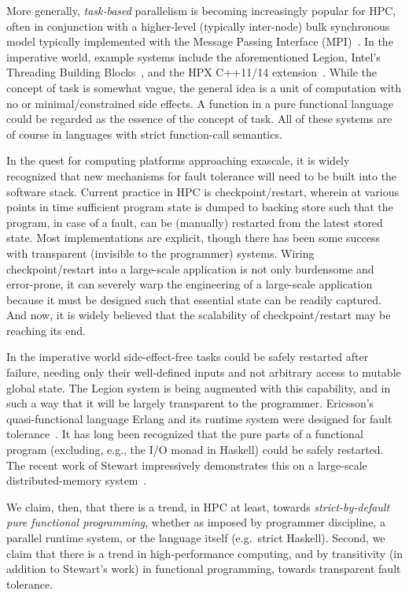 \documentclass{llncs}
\begin{document}
More generally, \emph{task-based} parallelism is becoming increasingly popular
for HPC, often in conjunction with a higher-level (typically inter-node) bulk
synchronous model typically implemented with the Message Passing Interface
(MPI)~\cite{MPI}.  In the imperative world, example systems include the
aforementioned Legion, Intel's Threading Building Blocks~\cite{Reinders:2007},
and the HPX C++11/14 extension~\cite{HPX}.  While the concept of task is
somewhat vague, the general idea is a unit of computation with no or
minimal/constrained side effects.  A function in a pure functional language
could be regarded as the essence of the concept of task.  All of these
systems are of course in languages with strict function-call semantics.

In the quest for computing platforms approaching exascale, it is widely
recognized that new mechanisms for fault tolerance will need to be built into
the software stack.  Current practice in HPC is checkpoint/restart, wherein at
various points in time sufficient program state is dumped to backing store such
that the program, in case of a fault, can be (manually) restarted from the
latest stored state.  Most implementations are explicit, though there has been
some success with transparent (invisible to the programmer) systems.  Wiring
checkpoint/restart into a large-scale application is not only burdensome and
error-prone, it can severely warp the engineering of a large-scale application
because it must be designed such that essential state can be readily captured.
And now, it is widely believed that the scalability of checkpoint/restart may
be reaching its end.

In the imperative world side-effect-free tasks could be safely restarted after
failure, needing only their well-defined inputs and not arbitrary access to
mutable global state.  The Legion system is being augmented with this
capability, and in such a way that it will be largely transparent to the
programmer.  Ericsson's quasi-functional language Erlang and its runtime
system were designed for fault tolerance~\cite{Cesarini:2009}.  It has long
been recognized that the pure parts of a functional program (excluding, e.g.,
the I/O monad in Haskell) could be safely restarted.  The recent work of
Stewart impressively demonstrates this on a large-scale distributed-memory
system~\cite{Stewart:2013}.

We claim, then, that there is a trend, in HPC at least, towards
\emph{strict-by-default pure functional programming}, whether as imposed by
programmer discipline, a parallel runtime system, or the language itself
(e.g.\ strict Haskell).  Second, we claim that there is a trend in
high-performance computing, and by transitivity (in addition to Stewart's
work) in functional programming, towards transparent fault tolerance.
\end{document}
